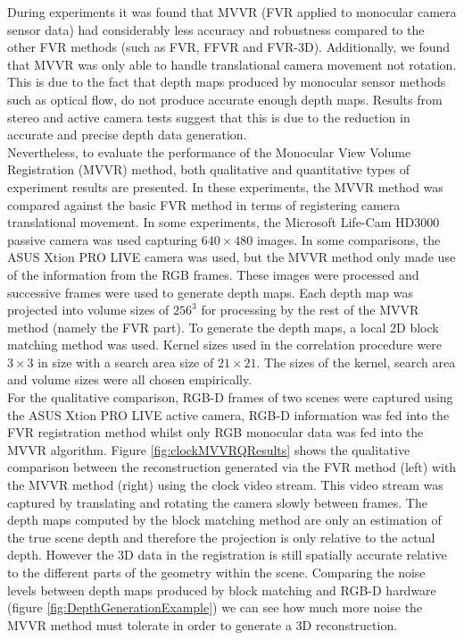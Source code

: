 
During experiments it was found that MVVR (FVR applied to monocular camera sensor data) had considerably less accuracy and robustness compared to the other FVR methods (such as FVR, FFVR and FVR-3D). Additionally, we found that MVVR was only able to handle translational camera movement not rotation. This is due to the fact that depth maps produced by monocular sensor methods such as optical flow, do not produce accurate enough depth maps. Results from stereo and active camera tests suggest that this is due to the reduction in accurate and precise depth data generation. \\

Nevertheless, to evaluate the performance of the Monocular View Volume Registration (MVVR) method, both qualitative and quantitative types of experiment results are presented. In these experiments, the MVVR method was compared against the basic FVR method in terms of registering camera translational movement. In some experiments, the Microsoft Life-Cam HD3000 passive camera was used capturing $640 \times 480$ images. In some comparisons, the ASUS Xtion PRO LIVE camera was used, but the MVVR method only made use of the information from the RGB frames. These images were processed and successive frames were used to generate depth maps. Each depth map was projected into volume sizes of $256^3$ for processing by the rest of the MVVR method (namely the FVR part). To generate the depth maps, a local 2D block matching method was used. Kernel sizes used in the correlation procedure were $3 \times 3$ in size with a search area size of $21 \times 21$. The sizes of the kernel, search area and volume sizes were all chosen empirically. \\


For the qualitative comparison, RGB-D frames of two scenes were captured using the ASUS Xtion PRO LIVE active camera, RGB-D information was fed into the FVR registration method whilst only RGB monocular data was fed into the MVVR algorithm. Figure \ref{fig:clockMVVRQResults} shows the qualitative comparison between the reconstruction generated via the FVR method (left) with the MVVR method (right) using the clock video stream. This video stream was captured by translating and rotating the camera slowly between frames. The depth maps computed by the block matching method are only an estimation of the true scene depth and therefore the projection is only relative to the
actual depth. However the 3D data in the registration is still spatially accurate relative to the different parts of the geometry within the scene. Comparing the noise levels between depth maps produced by block matching and RGB-D hardware (figure \ref{fig:DepthGenerationExample}) we can see how much more noise the MVVR method must tolerate in order to generate a 3D reconstruction. \\


